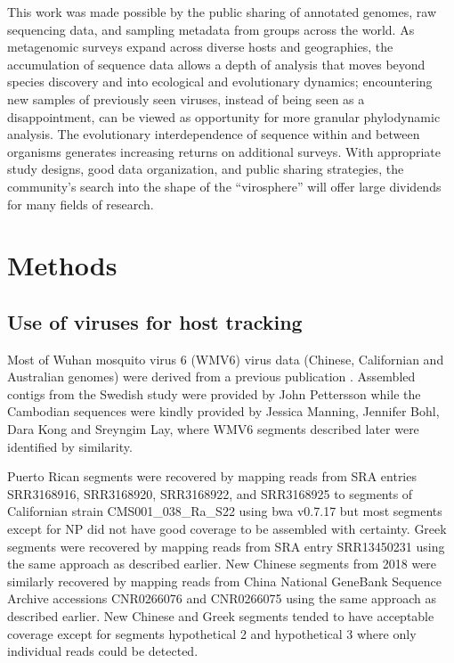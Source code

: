 \documentclass[11pt,twocolumn]{article}
\begin{document}
This work was made possible by the public sharing of annotated genomes, raw sequencing data, and sampling metadata from groups across the world. As metagenomic surveys expand across diverse hosts and geographies, the accumulation of sequence data allows a depth of analysis that moves beyond species discovery and into ecological and evolutionary dynamics; encountering new samples of previously seen viruses, instead of being seen as a disappointment, can be viewed as opportunity for more granular phylodynamic analysis. The evolutionary interdependence of sequence within and between organisms generates increasing returns on additional surveys. With appropriate study designs, good data organization, and public sharing strategies, the community's search into the shape of the ``virosphere'' will offer large dividends for many fields of research.

\section{Methods}

\subsection{Use of viruses for host tracking}

Most of Wuhan mosquito virus 6 (WMV6) virus data (Chinese, Californian and Australian genomes) were derived from a previous publication \citep{batson_single_2021}.
Assembled contigs from the Swedish study \citep{pettersson_meta-transcriptomic_2019} were provided by John Pettersson while the Cambodian sequences were kindly provided by Jessica Manning, Jennifer Bohl, Dara Kong and Sreyngim Lay, where WMV6 segments described later \citep{batson_single_2021} were identified by similarity.

Puerto Rican segments were recovered by mapping reads from SRA entries SRR3168916, SRR3168920, SRR3168922, and SRR3168925 \citep{frey_bioinformatic_2016} to segments of Californian strain CMS001\_038\_Ra\_S22 using bwa v0.7.17 \citep{li_fast_2009} but most segments except for NP did not have good coverage to be assembled with certainty.
Greek segments were recovered by mapping reads from SRA entry SRR13450231 \citep{konstantinidis_defining_2021} using the same approach as described earlier.
New Chinese segments from 2018 \citep{he_metagenomic_2021} were similarly recovered by mapping reads from China National GeneBank Sequence Archive accessions CNR0266076 and CNR0266075 using the same approach as described earlier.
New Chinese and Greek segments tended to have acceptable coverage except for segments hypothetical 2 and hypothetical 3 where only individual reads could be detected.
\end{document}
